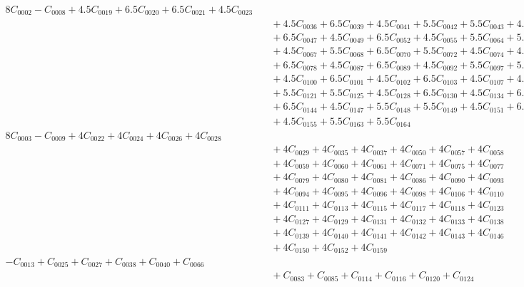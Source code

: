 \documentclass[a4paper,10pt]{article}
\begin{document}
{\begin{align}
8C_{0002} - C_{0008} + 4.5C_{0019} + 6.5C_{0020} + 6.5C_{0021} + 4.5C_{0023} \\[0.5ex]
&\quad  + 4.5C_{0036} + 6.5C_{0039} + 4.5C_{0041} + 5.5C_{0042} + 5.5C_{0043} + 4.5C_{0046} \\[0.5ex]
&\quad  + 6.5C_{0047} + 4.5C_{0049} + 6.5C_{0052} + 4.5C_{0055} + 5.5C_{0064} + 5.5C_{0065} \\[0.5ex]
&\quad  + 4.5C_{0067} + 5.5C_{0068} + 6.5C_{0070} + 5.5C_{0072} + 4.5C_{0074} + 4.5C_{0076} \\[0.5ex]
&\quad  + 6.5C_{0078} + 4.5C_{0087} + 6.5C_{0089} + 4.5C_{0092} + 5.5C_{0097} + 5.5C_{0099} \\[0.5ex]
&\quad  + 4.5C_{0100} + 6.5C_{0101} + 4.5C_{0102} + 6.5C_{0103} + 4.5C_{0107} + 4.5C_{0119} \\[0.5ex]
&\quad  + 5.5C_{0121} + 5.5C_{0125} + 4.5C_{0128} + 6.5C_{0130} + 4.5C_{0134} + 6.5C_{0135} \\[0.5ex]
&\quad  + 6.5C_{0144} + 4.5C_{0147} + 5.5C_{0148} + 5.5C_{0149} + 4.5C_{0151} + 6.5C_{0153} \\[0.5ex]
&\quad  + 4.5C_{0155} + 5.5C_{0163} + 5.5C_{0164} &= 0 && \text{(R0008)} \\
8C_{0003} - C_{0009} + 4C_{0022} + 4C_{0024} + 4C_{0026} + 4C_{0028} \\[0.5ex]
&\quad  + 4C_{0029} + 4C_{0035} + 4C_{0037} + 4C_{0050} + 4C_{0057} + 4C_{0058} \\[0.5ex]
&\quad  + 4C_{0059} + 4C_{0060} + 4C_{0061} + 4C_{0071} + 4C_{0075} + 4C_{0077} \\[0.5ex]
&\quad  + 4C_{0079} + 4C_{0080} + 4C_{0081} + 4C_{0086} + 4C_{0090} + 4C_{0093} \\[0.5ex]
&\quad  + 4C_{0094} + 4C_{0095} + 4C_{0096} + 4C_{0098} + 4C_{0106} + 4C_{0110} \\[0.5ex]
&\quad  + 4C_{0111} + 4C_{0113} + 4C_{0115} + 4C_{0117} + 4C_{0118} + 4C_{0123} \\[0.5ex]
&\quad  + 4C_{0127} + 4C_{0129} + 4C_{0131} + 4C_{0132} + 4C_{0133} + 4C_{0138} \\[0.5ex]
&\quad  + 4C_{0139} + 4C_{0140} + 4C_{0141} + 4C_{0142} + 4C_{0143} + 4C_{0146} \\[0.5ex]
&\quad  + 4C_{0150} + 4C_{0152} + 4C_{0159} &= 0 && \text{(R0009)} \\
-C_{0013} + C_{0025} + C_{0027} + C_{0038} + C_{0040} + C_{0066} \\[0.5ex]
&\quad  + C_{0083} + C_{0085} + C_{0114} + C_{0116} + C_{0120} + C_{0124} \\[0.5ex]

\end{align}}
\end{document}
